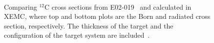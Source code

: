\begin{figure}[!h]
  \begin{center}
    \\
    \caption[Comparing $\mathrm{^{12}C}$ cross sections from E02-019 and calculated in XEMC]{\footnotesize{Comparing $\mathrm{^{12}C}$ cross sections from E02-019~\cite{nadia_thesis} and calculated in XEMC, where top and bottom plots are the Born and radiated cross section, respectively. The thickness of the target and the configuration of the target system are included~\cite{nadia_thesis}.}}
    \label{xs_nadia_com2}
  \end{center}
\end{figure}

